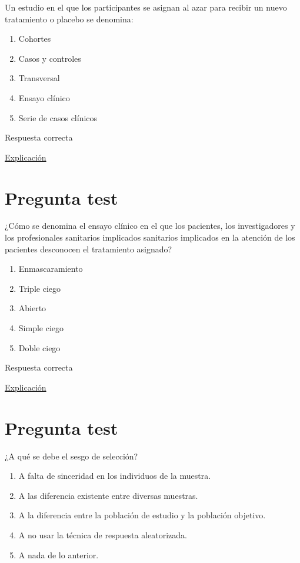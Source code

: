 \documentclass[
]{book}
\providecommand{\tightlist}{%
  \setlength{\itemsep}{0pt}\setlength{\parskip}{0pt}}
\begin{document}
Un estudio en el que los participantes se asignan al azar para recibir un nuevo tratamiento o placebo se denomina:

\begin{enumerate}
\def\labelenumi{\alph{enumi})}
\tightlist
\item
  Cohortes
\item
  Casos y controles
\item
  Transversal
\item
  Ensayo clínico
\item
  Serie de casos clínicos
\end{enumerate}

Respuesta correcta

\href{https://www.geicam.org/que-hacemos/ensayos-clinicos/que-es-un-ensayo-clinico}{Explicación}

\hypertarget{pregunta-test-47}{%
\section{Pregunta test}\label{pregunta-test-47}}

¿Cómo se denomina el ensayo clínico en el que los pacientes, los investigadores y los profesionales sanitarios implicados sanitarios implicados en la atención de los pacientes desconocen el tratamiento asignado?

\begin{enumerate}
\def\labelenumi{\alph{enumi})}
\tightlist
\item
  Enmascaramiento
\item
  Triple ciego
\item
  Abierto
\item
  Simple ciego
\item
  Doble ciego
\end{enumerate}

Respuesta correcta

\href{http://cv.uoc.edu/UOC/a/moduls/90/90_166d/web/main/m4/22d.html}{Explicación}

\hypertarget{pregunta-test-48}{%
\section{Pregunta test}\label{pregunta-test-48}}

¿A qué se debe el sesgo de selección?

\begin{enumerate}
\def\labelenumi{\alph{enumi})}
\tightlist
\item
  A falta de sinceridad en los individuos de la muestra.
\item
  A las diferencia existente entre diversas muestras.
\item
  A la diferencia entre la población de estudio y la población objetivo.
\item
  A no usar la técnica de respuesta aleatorizada.
\item
  A nada de lo anterior.
\end{enumerate}
\end{document}

